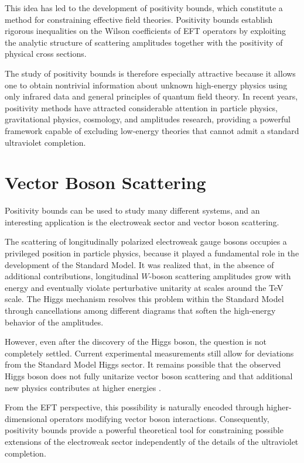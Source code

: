 This idea has led to the development of positivity bounds, which constitute a method for constraining effective field theories. Positivity bounds establish rigorous inequalities on the Wilson coefficients of EFT operators by exploiting the analytic structure of scattering amplitudes together with the positivity
of physical cross sections.

The study of positivity bounds is therefore especially attractive because it allows one
to obtain nontrivial information about unknown high-energy physics using only
infrared data and general principles of quantum field theory. In recent years,
positivity methods have attracted considerable attention in particle physics,
gravitational physics, cosmology, and amplitudes research, providing a powerful
framework capable of excluding low-energy theories that cannot admit a standard
ultraviolet completion.

\section{Vector Boson Scattering}

Positivity bounds can be used to study many different systems, and an interesting application is the electroweak sector and vector boson scattering.

The scattering of longitudinally polarized electroweak gauge bosons occupies a privileged position in particle physics, because it played a fundamental role in the development of the Standard Model. It was realized that, in the absence of additional contributions, longitudinal \(W\)-boson scattering amplitudes grow with energy and eventually violate perturbative unitarity at scales around the TeV scale. The Higgs mechanism resolves this problem within the Standard Model through cancellations among different diagrams that soften the high-energy behavior of the amplitudes.

However, even after the discovery of the Higgs boson, the question is not completely settled. Current experimental measurements still allow for deviations from the Standard Model Higgs sector. It remains possible that the observed Higgs boson does not fully unitarize vector boson scattering and that additional new physics contributes at higher energies \autocite{Lee:1977eg}.

From the EFT perspective, this possibility is naturally encoded through higher-dimensional operators modifying vector boson interactions. 
Consequently, positivity bounds provide a powerful theoretical tool for constraining possible extensions of the electroweak sector independently of the details of the ultraviolet completion.

